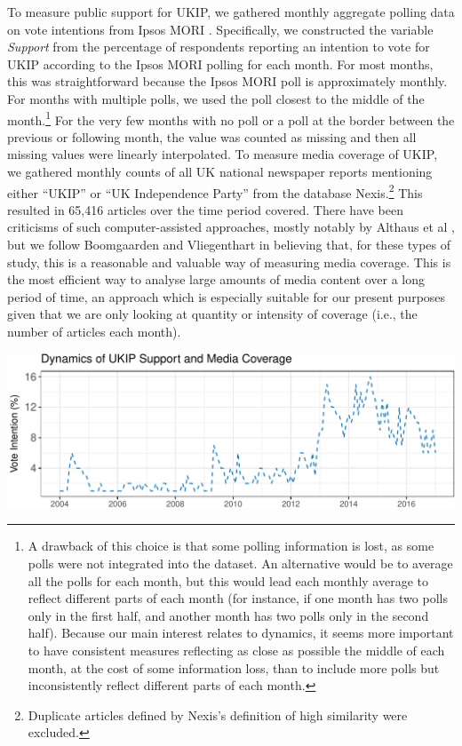 \documentclass[12pt,]{article}
\makeatletter
\def\maxwidth{\ifdim\Gin@nat@width>\linewidth\linewidth
\else\Gin@nat@width\fi}
\let\Oldincludegraphics\includegraphics
\renewcommand{\includegraphics}[1]{\Oldincludegraphics[width=\maxwidth]{#1}}
\makeatother
\begin{document}
To measure public support for UKIP, we gathered monthly aggregate
polling data on vote intentions from Ipsos MORI
\citep{IpsosMORI:gm2fXYNK}. Specifically, we constructed the variable
\emph{Support} from the percentage of respondents reporting an intention
to vote for UKIP according to the Ipsos MORI polling for each month. For
most months, this was straightforward because the Ipsos MORI poll is
approximately monthly. For months with multiple polls, we used the poll
closest to the middle of the
month.\footnote{A drawback of this choice is that some polling information is lost, as some polls were not integrated into the dataset. An alternative would be to average all the polls for each month, but this would lead each monthly average to reflect different parts of each month (for instance, if one month has two polls only in the first half, and another month has two polls only in the second half). Because our main interest relates to dynamics, it seems more important to have consistent measures reflecting as close as possible the middle of each month, at the cost of some information loss, than to include more polls but inconsistently reflect different parts of each month.}
For the very few months with no poll or a poll at the border between the
previous or following month, the value was counted as missing and then
all missing values were linearly interpolated. To measure media coverage
of UKIP, we gathered monthly counts of all UK national newspaper reports
mentioning either ``UKIP'' or ``UK Independence Party'' from the
database
Nexis.\footnote{Duplicate articles defined by Nexis's definition of high similarity were excluded.}
This resulted in 65,416 articles over the time period covered. There
have been criticisms of such computer-assisted approaches, mostly
notably by Althaus et al \citeyearpar{althaus_using_2001}, but we follow
Boomgaarden and Vliegenthart \citeyearpar{Boomgaarden:2007ia} in
believing that, for these types of study, this is a reasonable and
valuable way of measuring media coverage. This is the most efficient way
to analyse large amounts of media content over a long period of time, an
approach which is especially suitable for our present purposes given
that we are only looking at quantity or intensity of coverage (i.e., the
number of articles each month).

\setlength\parindent{0pt}

\includegraphics{ukip_media_files/figure-latex/unnamed-chunk-1-1.pdf}
\end{document}
